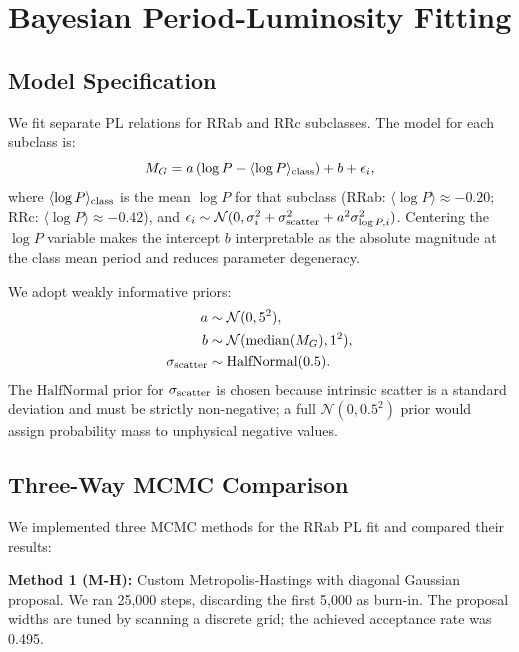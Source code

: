 \documentclass[10pt,preprint2]{aastex}
\begin{document}
\section{Bayesian Period-Luminosity Fitting}
\label{sec:pl}

\subsection{Model Specification}

We fit separate PL relations for RRab and RRc subclasses. The model for each subclass is:
\begin{equation}
  M_G = a\,(\log P - \langle \log P \rangle_{\rm class}) + b + \epsilon_i,
\end{equation}
where $\langle \log P \rangle_{\rm class}$ is the mean $\log P$ for that subclass (RRab: $\langle \log P \rangle \approx -0.20$; RRc: $\langle \log P \rangle \approx -0.42$), and $\epsilon_i \sim \mathcal{N}(0, \sigma_i^2 + \sigma_{\rm scatter}^2 + a^2\sigma_{\log P,i}^2)$. Centering the $\log P$ variable makes the intercept $b$ interpretable as the absolute magnitude at the class mean period and reduces parameter degeneracy.

We adopt weakly informative priors:
\begin{align}
  a &\sim \mathcal{N}(0, 5^2), \\
  b &\sim \mathcal{N}(\mathrm{median}(M_G), 1^2), \\
  \sigma_{\rm scatter} &\sim \mathrm{HalfNormal}(0.5).
\end{align}
The $\mathrm{HalfNormal}$ prior for $\sigma_{\rm scatter}$ is chosen because intrinsic scatter is a standard deviation and must be strictly non-negative; a full $\mathcal{N}(0, 0.5^2)$ prior would assign probability mass to unphysical negative values. 

\subsection{Three-Way MCMC Comparison}

We implemented three MCMC methods for the RRab PL fit and compared their results:

\textbf{Method 1 (M-H):} Custom Metropolis-Hastings with diagonal Gaussian proposal. We ran 25,000 steps, discarding the first 5,000 as burn-in. The proposal widths are tuned by scanning a discrete grid; the achieved acceptance rate was 0.495.
\end{document}
